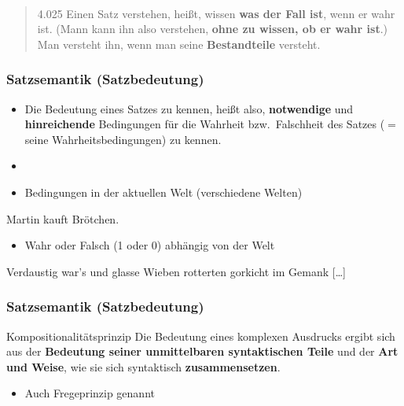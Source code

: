 \begin{frame}
\begin{minipage}{.3\textwidth}
\end{minipage}
~
\begin{minipage}{.65\textwidth}
	
	\begin{quote}
		4.025 Einen Satz verstehen, heißt, wissen \textbf{was der Fall ist}, wenn er wahr ist. (Mann kann ihn also verstehen, \textbf{ohne zu wissen, ob er wahr ist}.) Man versteht ihn, wenn man seine \textbf{Bestandteile} versteht. 
	\end{quote}
	\hfill \citep{Wittgenstein72a}
	
\end{minipage}

\end{frame}



\begin{frame}
\frametitle{Satzsemantik (Satzbedeutung)}

\begin{itemize}
	\item Die Bedeutung eines Satzes zu kennen, heißt also, \textbf{notwendige} und \textbf{hinreichende} Bedingungen für die Wahrheit bzw.\ Falschheit des Satzes ($=$ seine Wahrheitsbedingungen) zu kennen.
	\item[]
	\item Bedingungen in der aktuellen Welt (verschiedene Welten)
\end{itemize}

\pause 
	
	\ea Martin kauft Brötchen.
	\z
	
\begin{itemize}	
	\item Wahr oder Falsch (1 oder 0) \ras abhängig von der Welt
\end{itemize}

\pause 	
	
	\ea Verdaustig war's und glasse Wieben rotterten gorkicht im Gemank [\dots] \citep{SySt06a}
	\z 
	


\end{frame}


\begin{frame}
\frametitle{Satzsemantik (Satzbedeutung)}

\begin{block}{Kompositionalitätsprinzip}
Die Bedeutung eines komplexen Ausdrucks ergibt sich aus der \textbf{Bedeutung seiner unmittelbaren syntaktischen Teile} und der \textbf{Art und Weise}, wie sie sich syntaktisch \textbf{zusammensetzen}.
\end{block}

\begin{itemize}
	\item Auch Fregeprinzip genannt
\end{itemize}

\end{frame}



